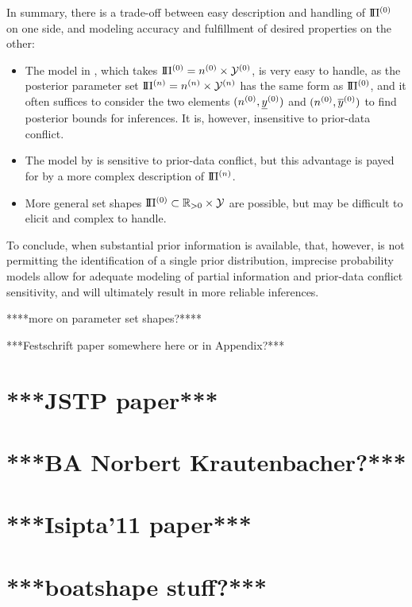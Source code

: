 In summary, there is a trade-off between easy description and handling of $\text{I}\!\Pi^{(0)}$ on one side,
and modeling accuracy and fulfillment of desired properties on the other:
\begin{itemize}%
\item The model in \textcite{2005:quaeghebeurcooman}, which takes $\text{I}\!\Pi^{(0)} = n^{(0)} \times \mathcal{Y}^{(0)}$, is very easy to handle,
as the posterior parameter set $\text{I}\!\Pi^{(n)} = n^{(n)} \times \mathcal{Y}^{(n)}$ has the same form as $\text{I}\!\Pi^{(0)}$,
and it often suffices to consider the two elements $(n^{(0)}, \underline{y}^{(0)})$ and $(n^{(0)}, \overline{y}^{(0)})$ to find posterior bounds for inferences.
It is, however, insensitive to prior-data conflict.
\item The model by \textcite{Walter2009a} is sensitive to prior-data conflict,
but this advantage is payed for by a more complex description of $\text{I}\!\Pi^{(n)}$.
\item More general set shapes $\text{I}\!\Pi^{(0)} \subset \mathbb{R}_{>0} \times \mathcal{Y}$ are possible,
but may be difficult to elicit and complex to handle.
\end{itemize}

To conclude, when substantial prior information is available, that, however,
is not permitting the identification of a single prior distribution,
imprecise probability models allow for adequate modeling of partial information and prior-data conflict sensitivity,
and will ultimately result in more reliable inferences.


****more on parameter set shapes?****

***Festschrift paper \parencite{Walter2010a} somewhere here or in Appendix?***


\section{***JSTP paper***}


\section{***BA Norbert Krautenbacher?***}


\section{***Isipta'11 paper***}


\section{***boatshape stuff?***}


